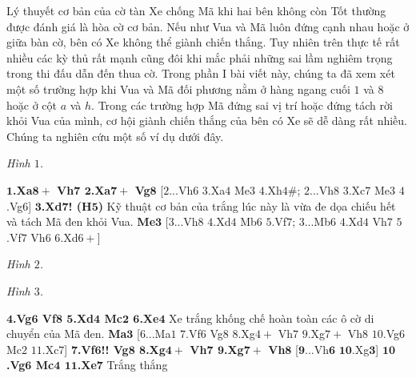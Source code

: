 \vspace*{155pt}
\begin{multicols}{2}
	Lý thuyết cơ bản của cờ tàn Xe chống Mã khi hai bên không còn Tốt thường được đánh giá là hòa cờ cơ bản. Nếu như Vua và Mã luôn đứng cạnh nhau hoặc ở giữa bàn cờ, bên có Xe không thể giành chiến thắng. Tuy nhiên trên thực tế rất nhiều các kỳ thủ rất mạnh cũng đôi khi mắc phải những sai lầm nghiêm trọng trong thi đấu dẫn đến thua cờ.
	\vskip 0.1cm
	Trong phần I bài viết này, chúng ta đã xem xét một số trường hợp khi Vua và Mã đối phương nằm ở hàng ngang cuối $1$ và $8$ hoặc ở cột $a$ và $h$. Trong các trường hợp Mã đứng sai vị trí hoặc đứng tách rời khỏi Vua của mình, cơ hội giành chiến thắng của bên có Xe sẽ dễ dàng rất nhiều.
	\vskip 0.1cm
	Chúng ta nghiên cứu một số ví dụ dưới đây. 
	\begin{center}
		\newgame
		\scalebox{0.85}\showboard
		\vskip 0.1cm
		\textit{\small\color{gocco}Hình $1$.}
	\end{center}
	\textbf{\color{gocco}$\pmb{1}$.Xa$\pmb{8+}$ Vh$\pmb{7}$ $\pmb{2}$.Xa$\pmb{7+}$ Vg$\pmb{8}$} [$2$...Vh$6$ $3$.Xa$4$ Me$3$ $4$.Xh$4\#$; $2$...Vh$8$ $3$.Xc$7$ Me$3$ $4$.Vg$6$]
	\vskip 0.1cm
	\textbf{\color{gocco}$\pmb{3}$.Xd$\pmb{7}$! (H$\pmb{5}$)} Kỹ thuật cơ bản của trắng lúc này là vừa đe dọa chiếu hết và tách Mã đen khỏi Vua. \textbf{\color{gocco}Me}$\pmb{3}$ [$3$...Vh$8$ $4$.Xd$4$ Mb$6$ $5$.Vf$7$; $3$...Mb$6$ $4$.Xd$4$ Vh$7$ $5$.Vf$7$ Vh$6$ $6$.Xd$6+$]
	\begin{center}
		\newgame
		\scalebox{0.85}\showboard
		\vskip 0.1cm
		\textit{\small\color{gocco}Hình $2$.}
	\end{center}
	\begin{center}
		\newgame
		\scalebox{0.85}\showboard
		\vskip 0.1cm
		\textit{\small\color{gocco}Hình $3$.}
	\end{center}
	\textbf{\color{gocco}$\pmb{4}$.Vg$\pmb{6}$ Vf$\pmb{8}$ $\pmb{5}$.Xd$\pmb{4}$ Mc$\pmb{2}$ $\pmb{6}$.Xe$\pmb{4}$} Xe trắng khống chế hoàn toàn các ô cờ di chuyển của Mã đen.  \textbf{\color{gocco}Ma}$\pmb{3}$ [$6$...Ma$1$ $7$.Vf$6$ Vg$8$ $8$.Xg$4+$ Vh$7$ $9$.Xg$7+$ Vh$8$ $10$.Vg$6$ Mc$2$ $11$.Xc$7$]
	\vskip 0.1cm
	\textbf{\color{gocco}$\pmb{7}$.Vf$\pmb{6}$!! Vg$\pmb{8}$ $\pmb{8}$.Xg$\pmb{4+}$ Vh$\pmb{7}$ $\pmb{9}$.Xg$\pmb{7+}$ Vh$\pmb{8}$} [$\pmb{9}$...Vh$\pmb{6}$ $\pmb{10}$.Xg$\pmb{3}$]
	\vskip 0.1cm
	\textbf{\color{gocco}$\pmb{10}$.Vg$\pmb{6}$ Mc$\pmb{4}$ $\pmb{11}$.Xe$\pmb{7}$} Trắng thắng

\end{multicols}
